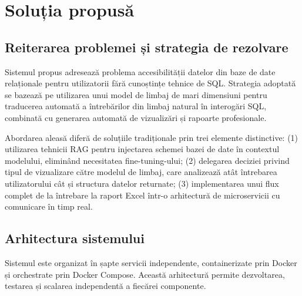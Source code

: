 \documentclass[12pt, a4paper]{report}
\begin{document}
\chapter{Soluția propusă}

\section{Reiterarea problemei și strategia de rezolvare}

Sistemul propus adresează problema accesibilității datelor din baze de date relaționale pentru utilizatorii fără cunoștințe tehnice de SQL. Strategia adoptată se bazează pe utilizarea unui model de limbaj de mari dimensiuni pentru traducerea automată a întrebărilor din limbaj natural în interogări SQL, combinată cu generarea automată de vizualizări și rapoarte profesionale.

Abordarea aleasă diferă de soluțiile tradiționale prin trei elemente distinctive: (1) utilizarea tehnicii RAG pentru injectarea schemei bazei de date în contextul modelului, eliminând necesitatea fine-tuning-ului; (2) delegarea deciziei privind tipul de vizualizare către modelul de limbaj, care analizează atât întrebarea utilizatorului cât și structura datelor returnate; (3) implementarea unui flux complet de la întrebare la raport Excel într-o arhitectură de microservicii cu comunicare în timp real.

\section{Arhitectura sistemului}

Sistemul este organizat în șapte servicii independente, containerizate prin Docker și orchestrate prin Docker Compose. Această arhitectură permite dezvoltarea, testarea și scalarea independentă a fiecărei componente.
\end{document}

